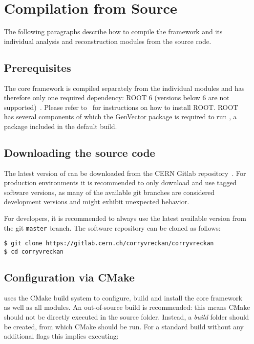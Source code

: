 \section{Compilation from Source}

The following paragraphs describe how to compile the \corry framework and its individual analysis and reconstruction modules from the source code.

\subsection{Prerequisites}
\label{sec:prerequisites}
The core framework is compiled separately from the individual modules and \corry has therefore only one required dependency: ROOT 6 (versions below 6 are not supported)~\cite{root}.
Please refer to~\cite{rootinstallation} for instructions on how to install ROOT.
ROOT has several components of which the GenVector package is required to run \corry, a package included in the default build.

\subsection{Downloading the source code}
The latest version of \corry can be downloaded from the CERN Gitlab repository~\cite{corry-repo}.
For production environments it is recommended to only download and use tagged software versions, as many of the available git branches are considered development versions and might exhibit unexpected behavior.

For developers, it is recommended to always use the latest available version from the git \texttt{master} branch.
The software repository can be cloned as follows:

\begin{verbatim}
$ git clone https://gitlab.cern.ch/corryvreckan/corryvreckan
$ cd corryvreckan
\end{verbatim}

\subsection{Configuration via CMake}
\label{sec:cmake_config}
\corry uses the CMake build system to configure, build and install the core framework as well as all modules.
An out-of-source build is recommended: this means CMake should not be directly executed in the source folder.
Instead, a \textit{build} folder should be created, from which CMake should be run.
For a standard build without any additional flags this implies executing:

